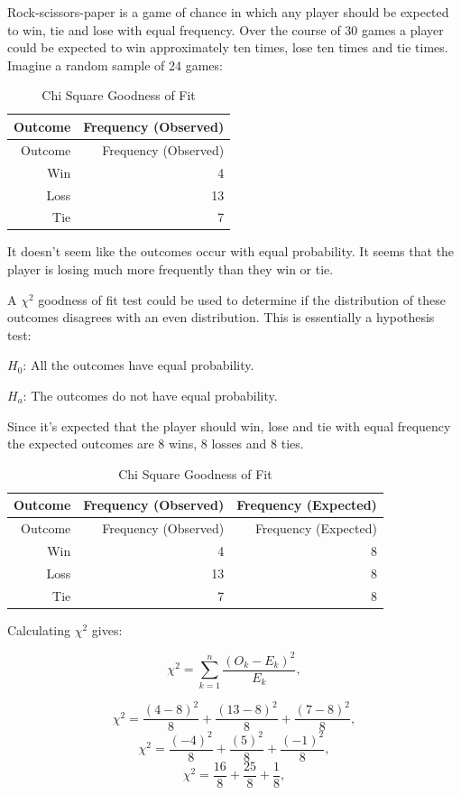 \documentclass[
]{book}
\begin{document}
Rock-scissors-paper is a game of chance in which any player should be expected to win, tie and lose with equal frequency. Over the course of 30 games a player could be expected to win approximately ten times, lose ten times and tie times. Imagine a random sample of 24 games:

\begin{longtable}[]{@{}rr@{}}
\caption{\label{tab:table011} Chi Square Goodness of Fit}\tabularnewline
\toprule
Outcome & Frequency (Observed) \\
\midrule
\endfirsthead
\toprule
Outcome & Frequency (Observed) \\
\midrule
\endhead
Win & 4 \\
Loss & 13 \\
Tie & 7 \\
\bottomrule
\end{longtable}

It doesn't seem like the outcomes occur with equal probability. It seems that the player is losing much more frequently than they win or tie.

A \(\chi^2\) goodness of fit test could be used to determine if the distribution of these outcomes disagrees with an even distribution. This is essentially a hypothesis test:

\(H_0\): All the outcomes have equal probability.

\(H_a\): The outcomes do not have equal probability.

Since it's expected that the player should win, lose and tie with equal frequency the expected outcomes are 8 wins, 8 losses and 8 ties.

\begin{longtable}[]{@{}rrr@{}}
\caption{\label{tab:table0011} Chi Square Goodness of Fit}\tabularnewline
\toprule
Outcome & Frequency (Observed) & Frequency (Expected) \\
\midrule
\endfirsthead
\toprule
Outcome & Frequency (Observed) & Frequency (Expected) \\
\midrule
\endhead
Win & 4 & 8 \\
Loss & 13 & 8 \\
Tie & 7 & 8 \\
\bottomrule
\end{longtable}

Calculating \(\chi^2\) gives:

\[\chi^2=\sum_{k=1}^{n}\frac{(O_k-E_k)^2}{E_k},\]

\[\chi^2=\frac{(4-8)^2}{8}+\frac{(13-8)^2}{8}+\frac{(7-8)^2}{8},\]
\[\chi^2=\frac{(-4)^2}{8}+\frac{(5)^2}{8}+\frac{(-1)^2}{8},\]
\[\chi^2=\frac{16}{8}+\frac{25}{8}+\frac{1}{8},\]
\end{document}
